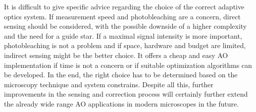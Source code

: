 \noindent It is difficult to give specific advice regarding the choice of the correct adaptive optics system. If measurement speed and photobleaching are a concern, direct sensing should be considered, with the possible downside of a higher complexity and the need for a guide star. If a maximal signal intensity is more important, photobleaching is not a problem and if space, hardware and budget are limited, indirect sensing might be the better choice. It offers a cheap and easy AO implementation if time is not a concern or if suitable optimization algorithms can be developed. In the end, the right choice has to be determined based on the microscopy technique and system constrains. Despite all this, further improvements in the sensing and correction process will certainly further extend the already wide range AO applications in modern microscopes in the future. 